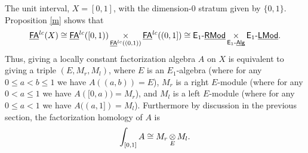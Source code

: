 \documentclass[twoside]{article}
\begin{document}
\begin{example}
    The unit interval, $X=[0,1]$, with the dimension-$0$ stratum given by $\{0,1\}$.
    Proposition \ref{m} shows that $$\underline{\smash{\mathsf{FA}}}^{lc}(X)\cong\underline{\smash{\mathsf{FA}}}^{lc}([0,1))
    \mathop{\operatorname{\times}}\limits_{\underline{\smash{\mathsf{FA}}}^{lc}((0,1))}\underline{\smash{\mathsf{FA}}}^{lc}((0,1])
    \cong\mathsf{E}_1\text{-}\underline{\smash{\mathsf{RMod}}}\mathop{\operatorname{\times}}\limits_{\mathsf{E}_1\text{-}\underline{\smash{\mathsf{Alg}}}}\mathsf{E}_1\text{-}\underline{\smash{\mathsf{LMod}}}.$$
    Thus, giving a locally constant factorization algebra $A$ on $X$ is equivalent
    to giving a triple $(E,M_r,M_l)$, where $E$ is an $E_1$-algebra (where for any
    $0\le a< b\le 1$ we have $A((a,b))=E$), $M_r$ is a 
    right $E$-module (where for any $0<a\le 1$ we have $A([0,a))=M_r$), and 
    $M_l$ is a left $E$-module (where for any $0\le a< 1$ we have $A((a,1])=M_l$).
    Furthermore by discussion in the previous section, the factorization homology
    of $A$ is $$\int_{[0,1]}A\cong M_r\mathop{\operatorname{\otimes}}\limits_EM_l.$$
\end{example}
\end{document}
